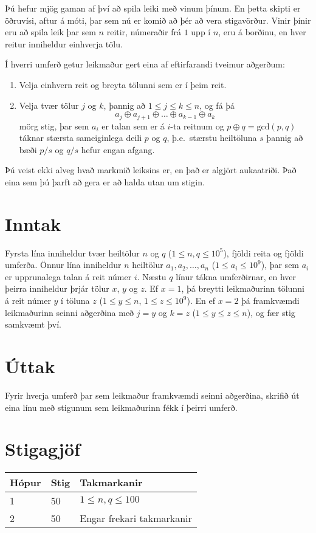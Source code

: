 %
Þú hefur mjög gaman af því að spila leiki með vinum þínum. En þetta skipti er
öðruvísi, aftur á móti, þar sem nú er komið að þér að vera stigavörður. Vinir
þínir eru að spila leik þar sem $n$ reitir, númeraðir frá $1$ upp í $n$, eru á
borðinu, en hver reitur inniheldur einhverja tölu.

Í hverri umferð getur leikmaður gert eina af eftirfarandi tveimur aðgerðum:
\begin{enumerate}
\item Velja einhvern reit og breyta tölunni sem er í þeim reit.
\item Velja tvær tölur $j$ og $k$, þannig að $1 \leq j \leq k \leq n$, og fá þá
\[
	a_j \oplus a_{j + 1} \oplus \dots \oplus a_{k - 1} \oplus a_k
\]
mörg stig, þar sem $a_i$ er talan sem er á $i$-ta reitnum og $p\oplus q =
\mathrm{gcd}(p,q)$ táknar stærsta sameiginlega deili $p$ og $q$, þ.e.\ stærstu
heiltöluna $s$ þannig að bæði $p/s$ og $q/s$ hefur engan afgang.
\end{enumerate}

Þú veist ekki alveg hvað markmið leiksins er, en það er algjört aukaatriði. Það
eina sem þú þarft að gera er að halda utan um stigin.

\section*{Inntak}
Fyrsta lína inniheldur tvær heiltölur $n$ og $q$ ($1 \leq n, q \leq 10^5$),
fjöldi reita og fjöldi umferða. Önnur lína inniheldur $n$ heiltölur $a_1, a_2,
\ldots, a_n$ ($1 \leq a_i \leq 10^9$), þar sem $a_i$ er upprunalega talan á
reit númer $i$. Næstu $q$ línur tákna umferðirnar, en hver þeirra inniheldur
þrjár tölur $x$, $y$ og $z$. Ef $x=1$, þá breytti leikmaðurinn tölunni á reit
númer $y$ í töluna $z$ ($1 \leq y \leq n$, $1 \leq z \leq 10^9$). En ef $x=2$
þá framkvæmdi leikmaðurinn seinni aðgerðina með $j=y$ og $k=z$ ($1\leq y \leq z
\leq n$), og fær stig samkvæmt því.

\section*{Úttak}
Fyrir hverja umferð þar sem leikmaður framkvæmdi seinni aðgerðina, skrifið út
eina línu með stigunum sem leikmaðurinn fékk í þeirri umferð.

\section*{Stigagjöf}
\begin{tabular}{|l|l|l|}
\hline
Hópur & Stig & Takmarkanir \\ \hline
1     & 50   & $1 \leq n, q \leq 100$ \\ \hline
2     & 50   & Engar frekari takmarkanir\\ \hline
\end{tabular}

